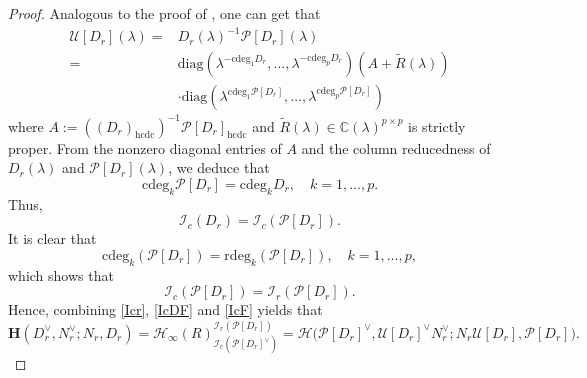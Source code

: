 \documentclass[12pt,reqno]{amsart}
\theoremstyle{plain}
\numberwithin{equation}{section}
\theoremstyle{remark}
\def\wtilde{\widetilde} \def\what{\widehat}
\begin{document}
\begin{proof}

Analogous to the proof of \cite[Lemma 14 (2)]{BPV1999}, one can get that
\begin{align*}
\mathscr{U}[D_r](\lambda)=&D_r(\lambda)^{-1} \mathscr{P}[D_r](\lambda)\\
=&\mathrm{diag}(\lambda^{-\mathrm{cdeg}_1D_r},\ldots,\lambda^{-\mathrm{cdeg}_pD_r})(A+\wtilde R(\lambda))\\
&\cdot \mathrm{diag}(\lambda^{\mathrm{cdeg}_1\mathscr{P}[D_r]},\ldots,\lambda^{\mathrm{cdeg}_p\mathscr{P}[D_r]})
\end{align*}
where $A:=((D_r)_{\mathrm{hcdc}})^{-1}\mathscr{P}[D_r]_{\mathrm{hcdc}}$ and $\wtilde R(\lambda)\in \mathbb C(\lambda)^{p\times p}$ is strictly proper.
From the nonzero diagonal entries of $A$ and the column reducedness of $D_r(\lambda)$ and $\mathscr{P}[D_r](\lambda)$, we deduce that 
\begin{equation*}
\mathrm{cdeg}_k \mathscr{P}[D_r] = \mathrm{cdeg}_k D_r, \quad k=1,\ldots,p.
\end{equation*}
Thus,
\begin{equation}\label{IcDF}
\mathcal{I}_c(D_r)=\mathcal{I}_c(\mathscr{P}[D_r]).
\end{equation}
It is clear that 
$$
\mathrm{cdeg}_k (\mathscr {P}[D_r])=\mathrm{rdeg}_k (\mathscr {P}[D_r]),
\quad k=1,\ldots,p,
$$
which shows that
\begin{equation}\label{IcF}
\mathcal{I}_c(\mathscr {P}[D_r])=\mathcal{I}_r(\mathscr {P}[D_r]).
\end{equation}
Hence, combining \eqref{Icr}, \eqref{IcDF} and \eqref{IcF} yields that
$$
\mathbf{H}(D^{\vee}_r, N^{\vee}_r; N_r, D_r) 
    = \mathscr{H}_{\infty}(R)^{\mathcal{I}_r(\mathscr{P}[D_r])}_{\mathcal{I}_c(\mathscr{P}[D_r]^{\vee})}
    = \mathscr{H}\bigl(\mathscr{P}[D_r]^{\vee}, \mathscr{U}[D_r]^{\vee} N_r^{\vee}; 
        N_r \mathscr{U}[D_r], \mathscr{P}[D_r]\bigr).
$$

\end{proof}
\end{document}
